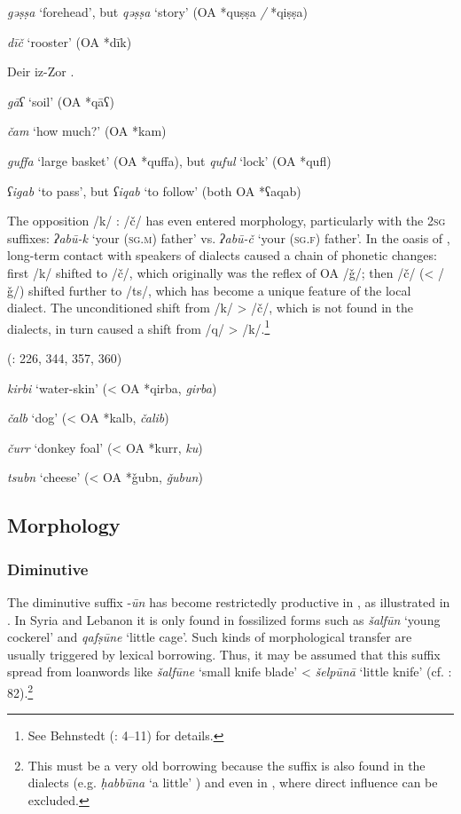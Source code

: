 \documentclass[output=paper]{langsci/langscibook}
\begin{document}
\textit{gəṣṣa} ‘forehead’, but \textit{qəṣṣa} ‘story’ (OA *quṣṣa \textit{/} *qiṣṣa)

\textit{dīč} ‘rooster’  (OA *dīk)
\z

\ea\label{Deir}Deir iz-Zor \citep[42--43]{Jastrow1978}. 

\textit{gāʕ} ‘soil’ (OA *qāʕ)

\textit{čam} ‘how much?’ (OA *kam)
\z

\ea\label{Baghdad} \citep[18--19]{Palva2009}

\textit{guffa} ‘large basket’ (OA *quffa), but \textit{quful} ‘lock’ (OA *qufl)

\textit{ʕigab} ‘to pass’, but \textit{ʕiqab} ‘to follow’ (both OA *ʕaqab)
\z

The opposition /k/ : /č/ has even entered morphology, particularly with the 2\textsc{sg} suffixes: \textit{ʔabū-k} `your (\textsc{sg.m}) father' vs. \textit{ʔabū-č} ‘your (\textsc{sg.f}) father’. In the  oasis of , long-term contact with speakers of  dialects caused a chain of phonetic changes: first /k/ shifted to /č/, which originally was the reflex of OA /ǧ/; then /č/ (< /ǧ/) shifted further to /ts/, which has become a unique feature of the local dialect. The unconditioned shift from /k/ > /č/, which is not found in the  dialects, in turn caused a shift from /q/ > /k/.\footnote{See Behnstedt (\citeyear{Behnstedt1994Soukhne}: 4--11) for details.}

\ea
{} (\citealt{Behnstedt1994Soukhne}: 226, 344, 357, 360)

\textit{kirbi} ‘water-skin’ (< OA *qirba,  \textit{girba})

\textit{čalb} ‘dog’ (< OA *kalb,  \textit{čalib})

\textit{čurr} ‘donkey foal’ (< OA *kurr,  \textit{ku\R\R})

\textit{tsubn} ‘cheese’ (< OA *ǧubn,  \textit{ǧubun})
\z

\subsection{Morphology}
\subsubsection{Diminutive}
The  {diminutive} suffix -\textit{ūn} has become restrictedly productive in   \citep[72]{Masliyah1997}, as illustrated in . In Syria and Lebanon it is only found in fossilized forms such as \textit{šalfūn} ‘young cockerel’ and \textit{qafṣūne} ‘little cage’.  Such kinds of morphological {transfer} are usually triggered by lexical borrowing. Thus, it may be assumed that this suffix spread from {loanwords} like \textit{šalfūne} ‘small knife blade’ <  \textit{šelpūnā} ‘little knife’ (cf. \citealt{Féghali1918}: 82).\footnote{This must be a very old borrowing because the suffix is also found in the  dialects (e.g. \textit{ḥabbūna} ‘a little’ \citealt[279]{Holes2002}) and even in   \citep[496]{Singer1984}, where direct  influence can be excluded.}
\end{document}
